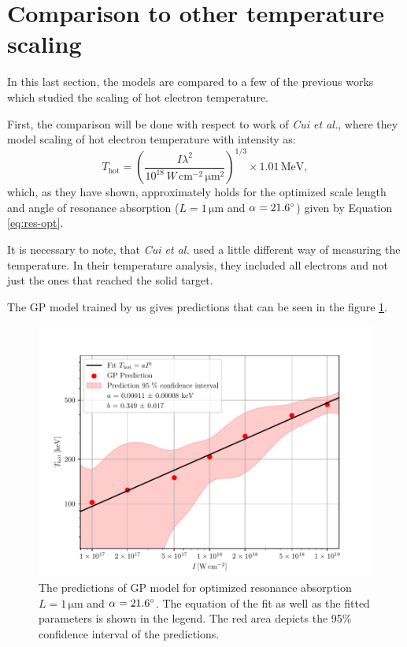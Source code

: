 \newpage
\section{Comparison to other temperature scaling}
\label{ch:comparison}
In this last section, the models are compared to a few of the previous works which studied the scaling of hot electron temperature.

First, the comparison will be done with respect to work of \textit{Cui et al.}\cite{cui2013}, where they model scaling of hot electron temperature with intensity as: 
\begin{equation}
	\label{eq:cui-scale}
	T_{\mathrm{hot}} = \left(\frac{I\lambda^2}{10^{18} \, W \, \mathrm{cm}^{-2} \, \mathrm{\mu m}^2}\right)^{1/3} \times 1.01 \, \mathrm{MeV},
\end{equation}
which, as they have shown, approximately holds for the optimized scale length and angle of resonance absorption ($L = 1 \, \mathrm{\mu m}$ and $\alpha = 21.6 \degree$) given by Equation \ref{eq:res-opt}.

It is necessary to note, that \textit{Cui et al.} used a little different way of measuring the temperature. In their temperature analysis, they included all electrons and not just the ones that reached the solid target.

The GP model trained by us gives predictions that can be seen in the figure \ref{fig:cui-compare-1}.

\begin{figure}[h]
	\centering
	\includegraphics[width=0.95 \textwidth]{figures/cui_compare1}
	\caption{The predictions of GP model for optimized resonance absorption $L = 1 \, \mathrm{\mu m}$ and $\alpha = 21.6 \degree$. The equation of the fit as well as the fitted parameters is shown in the legend. The red area depicts the 95\% confidence interval of the predictions.}
	\label{fig:cui-compare-1}
\end{figure}


